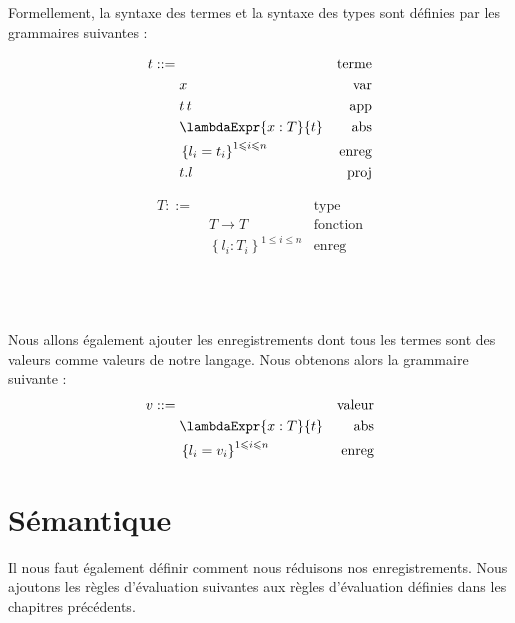 Formellement, la syntaxe des termes et la syntaxe des types sont définies par
les grammaires suivantes :

\begin{minipage}{0.45\textwidth}
  \begin{align*}
    t ::= & \, & \text{terme} \\
          & \; x & \text{var} \\
          & \; t \, t & \text{app} \\
          & \; \lambdaExpr{x : T}{t} & \text{abs} \\
          & \; \left\{ l_{i} = t_{i} \right\}^{1 \leq i \leq n} & \text{enreg} \\
          & \; t.l & \text{proj}
  \end{align*}
\end{minipage}
\label{syntax-terms:lambda-calculus-with-records}
\begin{minipage}{0.45\textwidth}
  \begin{align*}
    T ::= & \, & \text{type} \\
          & \; T \rightarrow T & \text{fonction} \\
          & \; \left\{ l_{i} : T_{i} \right\}^{1 \leq i \leq n} & \text{enreg}
  \end{align*}
\end{minipage}
\label{syntax-types:lambda-calculus-with-records}
\\
\\
\\
Nous allons également ajouter les enregistrements dont tous les termes sont des
valeurs comme valeurs de notre langage. Nous obtenons alors la grammaire
suivante :
\label{syntax-values:lambda-calculus-with-records}
\begin{align*}
  v ::= & \, & \text{valeur} \\
        & \; \lambdaExpr{x : T}{t} & \text{abs} \\
          & \; \left\{ l_{i} = v_{i} \right\}^{1 \leq i \leq n} & \text{enreg} \\
\end{align*}

\section*{Sémantique}

Il nous faut également définir comment nous réduisons nos
enregistrements. Nous ajoutons les règles d'évaluation suivantes aux règles
d'évaluation définies dans les chapitres précédents.

